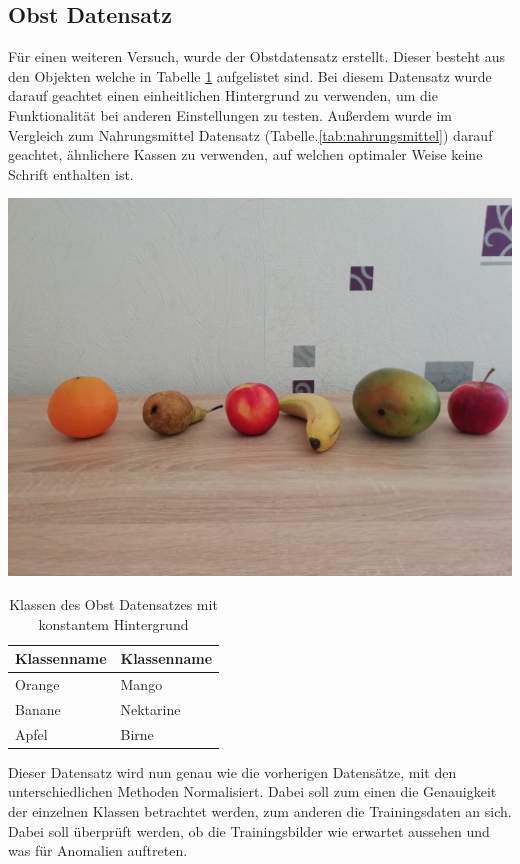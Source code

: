 \documentclass[a4paper,12pt,oneside]{article}
\begin{document}
\subsection{Obst Datensatz}
Für einen weiteren Versuch, wurde der Obstdatensatz erstellt. Dieser besteht aus den Objekten welche in Tabelle \ref{tab:obst} aufgelistet sind. Bei diesem Datensatz wurde darauf geachtet einen einheitlichen Hintergrund zu verwenden, um die Funktionalität bei anderen Einstellungen zu testen. Außerdem wurde im Vergleich zum Nahrungsmittel Datensatz (Tabelle.\ref{tab:nahrungsmittel}) darauf geachtet, ähnlichere Kassen zu verwenden, auf welchen optimaler Weise keine Schrift enthalten ist.
\begin{table}[htpb]
\caption{Klassen des Obst Datensatzes mit konstantem Hintergrund}
\begin{minipage}[r]{.5\textwidth} 
\includegraphics[width=.7\textwidth]{Sources/Obst_mit_hintergrund}  
\end{minipage} 
\hfill
\begin{minipage}[c]{.5\textwidth}\label{tab:obst} 
\centering  
\begin{tabular}{|l|l|}
\hline
Klassenname & Klassenname\\
\hline
Orange & Mango\\
Banane & Nektarine\\
Apfel & Birne\\
\hline
\end{tabular} 
\end{minipage}
\end{table}  
Dieser Datensatz wird nun genau wie die vorherigen Datensätze, mit den unterschiedlichen Methoden Normalisiert. Dabei soll zum einen die Genauigkeit der einzelnen Klassen betrachtet werden, zum anderen die Trainingsdaten an sich. Dabei soll überprüft werden, ob die Trainingsbilder wie erwartet aussehen und was für Anomalien auftreten. 
\end{document}
